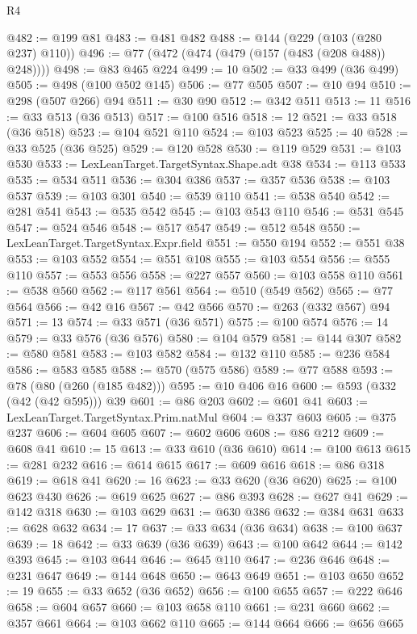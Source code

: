 \begin{lexlean}{R4}
\begin{coremodule}
@482 := @199 @81
@483 := @481 @482
@488 := @144 (@229 (@103 (@280 @237) @110))
@496 := @77 (@472 (@474 (@479 (@157 (@483 (@208 @488)) @248))))
@498 := @83 @465 @224
@499 := 10
@502 := @33 @499 (@36 @499)
@505 := @498 (@100 @502 @145)
@506 := @77 @505
@507 := @10 @94
@510 := @298 (@507 @266) @94
@511 := @30 @90
@512 := @342 @511
@513 := 11
@516 := @33 @513 (@36 @513)
@517 := @100 @516
@518 := 12
@521 := @33 @518 (@36 @518)
@523 := @104 @521 @110
@524 := @103 @523
@525 := 40
@528 := @33 @525 (@36 @525)
@529 := @120 @528
@530 := @119 @529
@531 := @103 @530
@533 := LexLeanTarget.TargetSyntax.Shape.adt @38
@534 := @113 @533
@535 := @534 @511
@536 := @304 @386
@537 := @357 @536
@538 := @103 @537
@539 := @103 @301
@540 := @539 @110
@541 := @538 @540
@542 := @281 @541
@543 := @535 @542
@545 := @103 @543 @110
@546 := @531 @545
@547 := @524 @546
@548 := @517 @547
@549 := @512 @548
@550 := LexLeanTarget.TargetSyntax.Expr.field
@551 := @550 @194
@552 := @551 @38
@553 := @103 @552
@554 := @551 @108
@555 := @103 @554
@556 := @555 @110
@557 := @553 @556
@558 := @227 @557
@560 := @103 @558 @110
@561 := @538 @560
@562 := @117 @561
@564 := @510 (@549 @562)
@565 := @77 @564
@566 := @42 @16
@567 := @42 @566
@570 := @263 (@332 @567) @94
@571 := 13
@574 := @33 @571 (@36 @571)
@575 := @100 @574
@576 := 14
@579 := @33 @576 (@36 @576)
@580 := @104 @579
@581 := @144 @307
@582 := @580 @581
@583 := @103 @582
@584 := @132 @110
@585 := @236 @584
@586 := @583 @585
@588 := @570 (@575 @586)
@589 := @77 @588
@593 := @78 (@80 (@260 (@185 @482)))
@595 := @10 @406 @16
@600 := @593 (@332 (@42 (@42 @595))) @39
@601 := @86 @203
@602 := @601 @41
@603 := LexLeanTarget.TargetSyntax.Prim.natMul
@604 := @337 @603
@605 := @375 @237
@606 := @604 @605
@607 := @602 @606
@608 := @86 @212
@609 := @608 @41
@610 := 15
@613 := @33 @610 (@36 @610)
@614 := @100 @613
@615 := @281 @232
@616 := @614 @615
@617 := @609 @616
@618 := @86 @318
@619 := @618 @41
@620 := 16
@623 := @33 @620 (@36 @620)
@625 := @100 @623 @430
@626 := @619 @625
@627 := @86 @393
@628 := @627 @41
@629 := @142 @318
@630 := @103 @629
@631 := @630 @386
@632 := @384 @631
@633 := @628 @632
@634 := 17
@637 := @33 @634 (@36 @634)
@638 := @100 @637
@639 := 18
@642 := @33 @639 (@36 @639)
@643 := @100 @642
@644 := @142 @393
@645 := @103 @644
@646 := @645 @110
@647 := @236 @646
@648 := @231 @647
@649 := @144 @648
@650 := @643 @649
@651 := @103 @650
@652 := 19
@655 := @33 @652 (@36 @652)
@656 := @100 @655
@657 := @222 @646
@658 := @604 @657
@660 := @103 @658 @110
@661 := @231 @660
@662 := @357 @661
@664 := @103 @662 @110
@665 := @144 @664
@666 := @656 @665

\end{coremodule}
\end{lexlean}
